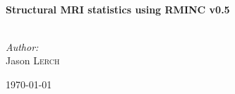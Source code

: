 \begin{titlepage}
 
\begin{center}
 
 
 
 
 
 
\HRule \\[0.4cm]
{ \huge \bfseries Structural MRI statistics using RMINC v0.5}\\[0.4cm]
 
\HRule \\[1.5cm]
 
\begin{minipage}{0.4\textwidth}
\begin{center}
\emph{Author:}\\
Jason \textsc{Lerch}
\end{center}
\end{minipage}
 
\vfill
 
{\large \today}
 
\end{center}
 
\end{titlepage}
